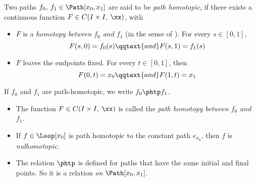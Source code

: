 \documentclass[../main-v2-manifolds.tex]{subfiles}
\begin{document}
\begin{definition}\label{munkres:path-homotopy}
    Two paths $f_0,\: f_1\in\Path[x_0,x_1]$ are said to be \emph{path homotopic}, if there exists a continuous function $F\in C(I\times I,\: \xx)$, with
    \begin{itemize}
        \item $F$ is a \emph{homotopy between $f_0$ and $f_1$} (in the sense of ). For every $s\in [0,1]$,
        \begin{equation}\label{munkres:path-homotopy-deformation}
            F(s,0)=f_0(s)\qqtext{and}F(s,1)=f_1(s)
        \end{equation}
        \item $F$ leaves the endpoints fixed. For every $t\in[0,1]$, then
        \begin{equation}\label{munkres:path-homotopy-endpoints}
            F(0,t)=x_0\qqtext{and}F(1,t)=x_1
        \end{equation}
    \end{itemize}
    If $f_0$ and $f_1$ are path-homotopic, we write $f_0\phtp f_1$.\\

    \begin{itemize}
        \item The function $F\in C(I\times I,\: \xx)$ is called the \emph{path homotopy between $f_0$ and $f_1$}. 
        \item If $f\in\Loop[x_0]$ is path homotopic to the constant path $e_{x_0}$, then $f$ is \emph{nulhomotopic}.
        \item The relation $\phtp$ is defined for paths that have the same initial and final points. So it is a relation \emph{on} $\Path[x_0,x_1]$.
    \end{itemize}
\end{definition}
\end{document}
